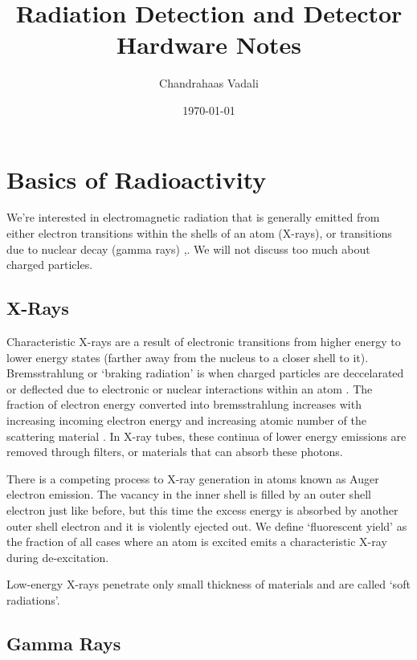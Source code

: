 \documentclass{article}
\title{Radiation Detection and Detector Hardware Notes}
\author{Chandrahaas Vadali}
\date{\today}
\begin{document}
\maketitle
\tableofcontents  %

\newpage


\section{Basics of Radioactivity}

We're interested in electromagnetic radiation that is generally emitted from either electron transitions within the shells of an atom (X-rays),
or transitions due to nuclear decay (gamma rays) \cite{NationalToxicologyProgram2021},\cite{Knoll2000}. We will not discuss too much about charged particles.

\subsection{X-Rays}

Characteristic X-rays are a result of electronic transitions from higher energy to lower energy states (farther away from the nucleus to a closer shell to it). 
Bremsstrahlung or `braking radiation' is when charged particles are deccelarated or deflected due to electronic or nuclear interactions within an atom \cite{NationalToxicologyProgram2021}.
The fraction of electron energy converted into bremsstrahlung increases with increasing incoming electron energy and increasing atomic number of the scattering material \cite{Knoll2000}.
In X-ray tubes, these continua of lower energy emissions are removed through filters, or materials that can absorb these photons. 


There is a competing process to X-ray generation in atoms known as Auger electron emission. The vacancy in the inner shell is filled by an outer shell electron just like before, but this time the excess
energy is absorbed by another outer shell electron and it is violently ejected out. We define `fluorescent yield' as the fraction of all cases where an atom is excited emits a characteristic X-ray 
during de-excitation.


Low-energy X-rays penetrate only small thickness of materials and are called `soft radiations'.




\subsection{Gamma Rays}
\end{document}

